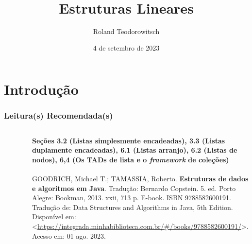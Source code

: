 \documentclass[aspectratio=169]{beamer}
\title[\sc{Estruturas Lineares}]{Estruturas Lineares}
\author[Roland Teodorowitsch]{Roland Teodorowitsch}
\institute[ALEST I - EP - PUCRS]{Algoritmos e Estruturas de Dados I - Escola Politécnica - PUCRS}
\date{4 de setembro de 2023}
\begin{document}
\justifying

\begin{frame}
	\titlepage
\end{frame}

\section{Introdução}

\begin{frame}\frametitle{Leitura(s) Recomendada(s)}

\begin{columns}[T]
\begin{column}{0.15\linewidth}
\vspace{-3mm}
\begin{figure}[h]
	\centering
	\includegraphics[height=0.3\paperheight]{imagens/livro_goodrich.jpg}
\end{figure}
\end{column}
\begin{column}{0.85\linewidth}
\tiny{\textbf{Seções 3.2 (Listas simplesmente encadeadas), 3.3 (Listas duplamente encadeadas), 6.1 (Listas arranjo), 6.2 (Listas de nodos), 6,4 (Os TADs de lista e o \emph{framework} de coleções)}\\
~}\\
\scriptsize{GOODRICH, Michael T.; TAMASSIA, Roberto. \textbf{Estruturas de dados e algoritmos em Java}. Tradução: Bernardo Copstein. 5. ed. Porto Alegre: Bookman, 2013. xxii, 713 p. E-book. ISBN 9788582600191. Tradução de: Data Structures and Algorithms in Java, 5th Edition. Disponível em: \textless{}\url{https://integrada.minhabiblioteca.com.br/\#/books/9788582600191/}\textgreater{}. Acesso em: 01 ago. 2023.}
\end{column}
\end{columns}

\end{frame}
\end{document}
